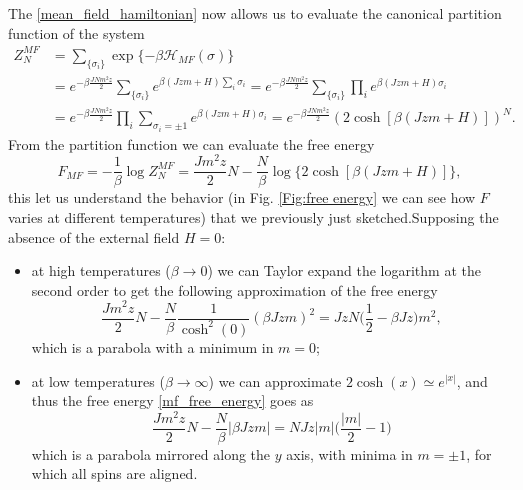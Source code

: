 The \eqref{mean_field_hamiltonian} now allows us to evaluate the canonical partition function of the system
\begin{align*}
    Z_{N}^{MF}&=\sum_{\{\sigma_i\}}\exp\{-\beta\mathcal{H}_{MF} (\sigma)\}\\&=e^{-\beta\frac{JNm^2z}{2}}\sum_{\{\sigma_i\}}e^{\beta(Jzm+H)\sum_i \sigma_i}=e^{-\beta\frac{JNm^2z}{2}}\sum_{\{\sigma_i\}}\prod_{i}e^{\beta(Jzm+H)\sigma_i}\\&=e^{-\beta\frac{JNm^2z}{2}}\prod_{i}\sum_{\sigma_i=\pm1}e^{\beta(Jzm+H)\sigma_i}=e^{-\beta\frac{JNm^2z}{2}}(2\cosh[\beta(Jzm+H)])^N.
\end{align*}
From the partition function we can evaluate the free energy
\begin{equation}
    \label{mf_free_energy}
    F_{MF}=-\frac{1}{\beta}\log Z_{N}^{MF}=\frac{Jm^2z}{2}N-\frac{N}{\beta}\log\{2\cosh[\beta(Jzm+H)]\},
\end{equation}
this let us understand the behavior (in Fig. \ref{Fig:free energy} we can see how $F$ varies at different temperatures) that we previously just sketched.\newpage Supposing the absence of the external field $H=0$:
\begin{itemize}
    \item at high temperatures ($\beta \rightarrow0$) we can Taylor expand the logarithm at the second order to get the following approximation of the free energy 
    \begin{equation*}
        \frac{Jm^2z}{2}N-\frac{N}{\beta} \frac{1}{\cosh^2(0)}  (\beta Jzm)^2=JzN\bigg(\frac{1}{2}-\beta Jz\bigg)m^2,
    \end{equation*}
    which is a parabola with a minimum in $m=0$;
    \item at low temperatures ($\beta \rightarrow\infty$) we can approximate $2\cosh(x)\simeq e^{|x|}$, and thus the free energy \eqref{mf_free_energy} goes as 
    \begin{equation*}
        \frac{Jm^2z}{2}N-\frac{N}{\beta}|\beta Jzm|= NJz|m|\bigg(\frac{|m|}{2}-1\bigg)
    \end{equation*}
    which is a parabola mirrored along the $y$ axis, with minima in $m=\pm1$, for which all spins are aligned.
\end{itemize}
